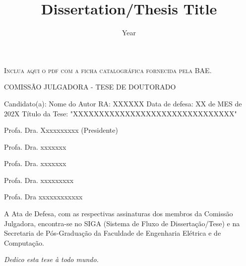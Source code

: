 \documentclass[12pt,oneside,a4paper,english]{abntex2}
\date{Year}
\title{Dissertation/Thesis Title}
\renewcommand\maketitle{}
\begin{document}
\maketitle
\imprimircapa


\imprimirfolhaderosto*


\begin{fichacatalografica}
    \vspace*{\fill}
    \begin{center}
        \textsc{Inclua aqui o pdf com a ficha catalogr\'{a}fica fornecida pela BAE.}
    \end{center}
    \vspace*{\fill}
\end{fichacatalografica}


\begin{folhadeaprovacao}
  \begin{center}
    COMISS\~{A}O JULGADORA - TESE DE DOUTORADO
\end{center}
\noindent
\begin{minipage}{\textwidth}\SingleSpacing
Candidato(a): Nome do Autor      RA: XXXXXX
Data de defesa: XX de MES de 202X
Título da Tese: "XXXXXXXXXXXXXXXXXXXXXXXXXXXXXXX"
\vspace{2cm}

Profa. Dra. Xxxxxxxxxx (Presidente)

Profa. Dra. xxxxxxx

Profa. Dra. xxxxxxx

Profa. Dra. xxxxxxxxx

Profa. Dra xxxxxxxxxxxx

\vspace{2cm}

A Ata de Defesa, com as respectivas assinaturas dos membros da Comiss\~{a}o Julgadora, encontra-se no SIGA (Sistema de Fluxo de Disserta\c{c}\~{a}o/Tese) e na Secretaria de P\'{o}s-Gradua\c{c}\~{a}o da Faculdade de Engenharia El\'{e}trica e de Computa\c{c}\~{a}o.
\end{minipage}

\end{folhadeaprovacao}


\begin{dedicatoria}
   \vspace*{\fill}
   \centering
   \noindent
   \textit{ Dedico esta tese \`{a} todo mundo.} \vspace*{\fill}
\end{dedicatoria}
\end{document}
